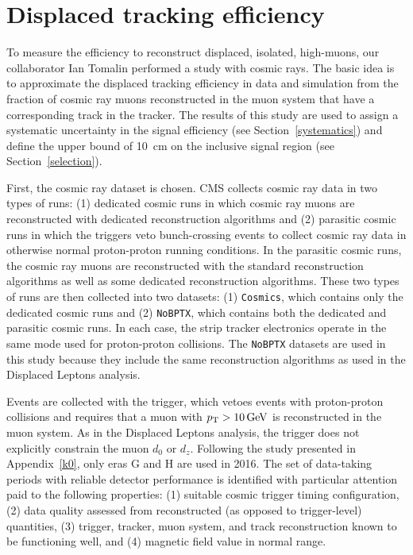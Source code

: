 \chapter{Displaced tracking efficiency}
\label{displaced_tracking_eff}
To measure the efficiency to reconstruct displaced, isolated, high-\pt muons, our collaborator Ian Tomalin performed a study with cosmic rays. The basic idea is to approximate the displaced tracking efficiency in data and simulation from the fraction of cosmic ray muons reconstructed in the muon system that have a corresponding track in the tracker. The results of this study are used to assign a systematic uncertainty in the signal efficiency (see Section~\ref{systematics}) and define the upper bound of \SI{10}{\cm} on the inclusive signal region (see Section~\ref{selection}).

First, the cosmic ray dataset is chosen. CMS collects cosmic ray data in two types of runs: (1) dedicated cosmic runs in which cosmic ray muons are reconstructed with dedicated reconstruction algorithms and (2) parasitic cosmic runs in which the triggers veto bunch-crossing events to collect cosmic ray data in otherwise normal proton-proton running conditions. In the parasitic cosmic runs, the cosmic ray muons are reconstructed with the standard reconstruction algorithms as well as some dedicated reconstruction algorithms. These two types of runs are then collected into two datasets: (1) \texttt{Cosmics}, which contains only the dedicated cosmic runs and (2) \texttt{NoBPTX}, which contains both the dedicated and parasitic cosmic runs. In each case, the strip tracker electronics operate in the same mode used for proton-proton collisions. The \texttt{NoBPTX} datasets are used in this study because they include the same reconstruction algorithms as used in the Displaced Leptons analysis.

Events are collected with the  trigger, which vetoes events with proton-proton collisions and requires that a muon with $\pt>\SI{10}{\GeV}$ is reconstructed in the muon system. As in the Displaced Leptons analysis, the trigger does not explicitly constrain the muon $d_0$ or $d_z$. Following the study presented in Appendix~\ref{k0}, only eras G and H are used in 2016. The set of data-taking periods with reliable detector performance is identified with particular attention paid to the following properties: (1) suitable cosmic trigger timing configuration, (2) data quality assessed from reconstructed (as opposed to trigger-level) quantities, (3) trigger, tracker, muon system, and track reconstruction known to be functioning well, and (4) magnetic field value in normal range.

